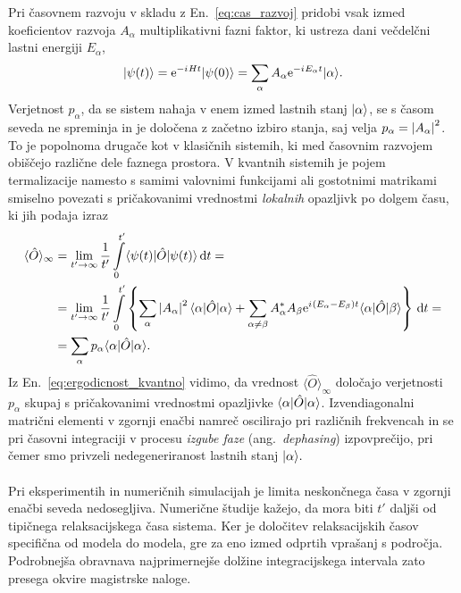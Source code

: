 Pri časovnem razvoju v skladu z En.~\eqref{eq:cas_razvoj} pridobi vsak izmed koeficientov razvoja $A_\alpha$ multiplikativni fazni faktor, ki ustreza dani večdelčni lastni energiji $E_\alpha$, 
$$
\vert\psi(t)\rangle=\mathrm{e}^{-{i\mkern1mu} H t}\vert\psi(0)\rangle=\sum\limits_\alpha A_\alpha \mathrm{e}^{-{i\mkern1mu} E_\alpha t}\vert\alpha\rangle.
$$
Verjetnost $p_\alpha$, da se sistem nahaja v enem izmed lastnih stanj $\vert\alpha\rangle$, se s časom seveda ne spreminja in je določena z začetno izbiro stanja, saj velja $p_\alpha=\left| A_\alpha \right|^2$. To je popolnoma drugače kot v klasičnih sistemih, ki med časovnim razvojem obiščejo različne dele faznega prostora. V kvantnih sistemih je pojem termalizacije namesto s samimi valovnimi funkcijami	ali gostotnimi matrikami smiselno povezati  s pričakovanimi vrednostmi \emph{lokalnih} opazljivk po dolgem času, ki jih podaja izraz~\cite{deutsch1991quantum}~\cite{abanin2018ergodicity}
\begin{equation}\label{eq:ergodicnost_kvantno}
\begin{split}
\langle \hat{O}\rangle_\infty &=\lim_{t'\to\infty}\frac{1}{t'}\int\limits_0^{t'} \langle \psi(t) \vert\hat{O}\vert\psi(t)\rangle\,\mathrm{d} t =\\
&=\lim_{t'\to\infty}\frac{1}{t'}\int\limits_0^{t'}\left\{\sum\limits_\alpha\left| A_\alpha \right|^2\langle \alpha \vert\hat{O}\vert\alpha\rangle+        \sum\limits_{\alpha\neq\beta} A_\alpha^* A_\beta\mathrm{e}^{{i\mkern1mu}\left(E_\alpha-E_\beta\right)t} \langle \alpha \vert\hat{O}\vert\beta\rangle\right\}\,\mathrm{d} t=\\
 &=\sum\limits_\alpha p_\alpha\langle \alpha \vert\hat{O}\vert\alpha\rangle.
 \end{split}
\end{equation}
Iz En.~\eqref{eq:ergodicnost_kvantno} vidimo, da vrednost $\langle \hat{O}\rangle_\infty$ določajo verjetnosti $p_\alpha$ skupaj s pričakovanimi vrednostmi opazljivke $\langle \alpha \vert\hat{O}\vert\alpha\rangle$. Izvendiagonalni matrični elementi v zgornji enačbi namreč oscilirajo pri različnih frekvencah in se pri časovni integraciji v procesu \emph{izgube faze} (ang.~\emph{dephasing}) izpovprečijo, pri čemer smo privzeli nedegeneriranost lastnih stanj $\vert\alpha\rangle.$ 
\\\\
Pri eksperimentih in numeričnih simulacijah je limita neskončnega časa v zgornji enačbi seveda nedosegljiva. Numerične študije kažejo, da mora biti $t'$ daljši od tipičnega relaksacijskega časa sistema. Ker je določitev relaksacijskih časov specifična od modela do modela, gre za eno izmed odprtih vprašanj s področja. Podrobnejša obravnava najprimernejše dolžine integracijskega intervala zato presega okvire magistrske naloge. 
